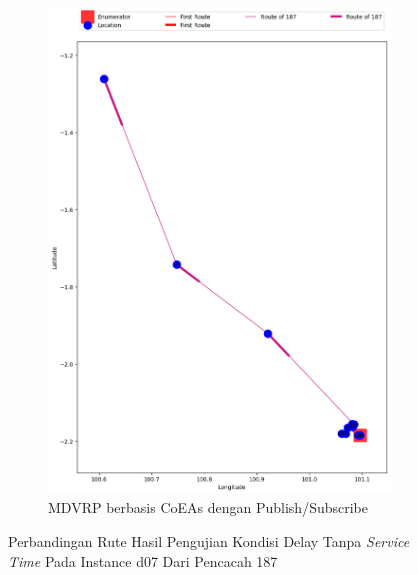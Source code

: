 \begin{figure}[H]\ContinuedFloat
	\centering
	\begin{subfigure}[t]{\textwidth}
		\centering
		\includegraphics[width=\textwidth]{Resources/Images/delayed_7/real_m15_n100_delayed_7_187_pubsub_coes}
		\caption{MDVRP berbasis CoEAs dengan Publish/Subscribe}
		\label{fig:real_m15_n100_delayed_7_187_pubsub_coes}
	\end{subfigure}
	\caption{Perbandingan Rute Hasil Pengujian Kondisi Delay Tanpa \textit{Service Time} Pada Instance d07 Dari Pencacah 187}
	\label{fig:real_m15_n100_delayed_7_187_contd}
\end{figure}


